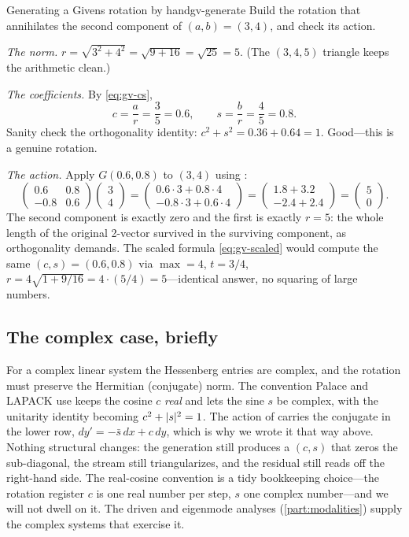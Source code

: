 \begin{workedexample}{Generating a Givens rotation by hand}{gv-generate}
Build the rotation that annihilates the second component of $(a,b) = (3,4)$, and check
its action.

\emph{The norm.} $r = \sqrt{3^2 + 4^2} = \sqrt{9 + 16} = \sqrt{25} = 5$. (The
$(3,4,5)$ triangle keeps the arithmetic clean.)

\emph{The coefficients.} By \cref{eq:gv-cs},
\[
  c = \frac{a}{r} = \frac{3}{5} = 0.6, \qquad
  s = \frac{b}{r} = \frac{4}{5} = 0.8.
\]
Sanity check the orthogonality identity: $c^2 + s^2 = 0.36 + 0.64 = 1$. Good---this is
a genuine rotation.

\emph{The action.} Apply $G(0.6,0.8)$ to $(3,4)$ using :
\[
  \begin{pmatrix} 0.6 & 0.8 \\ -0.8 & 0.6 \end{pmatrix}
  \begin{pmatrix} 3 \\ 4 \end{pmatrix}
  = \begin{pmatrix} 0.6\cdot 3 + 0.8\cdot 4 \\ -0.8\cdot 3 + 0.6\cdot 4 \end{pmatrix}
  = \begin{pmatrix} 1.8 + 3.2 \\ -2.4 + 2.4 \end{pmatrix}
  = \begin{pmatrix} 5 \\ 0 \end{pmatrix}.
\]
The second component is exactly zero and the first is exactly $r = 5$: the whole length
of the original 2-vector survived in the surviving component, as orthogonality
demands. The scaled formula \eqref{eq:gv-scaled} would compute the same $(c,s)=(0.6,0.8)$
via $\max=4$, $t = 3/4$, $r = 4\sqrt{1 + 9/16} = 4\cdot(5/4) = 5$---identical answer,
no squaring of large numbers.
\end{workedexample}

\subsection{The complex case, briefly}
\label{sec:gv-complex}

For a complex linear system the Hessenberg entries are complex, and the rotation must
preserve the Hermitian (conjugate) norm. The convention Palace and LAPACK use keeps the
cosine $c$ \emph{real} and lets the sine $s$ be complex, with the unitarity identity
becoming $c^2 + \lvert s\rvert^2 = 1$. The action of  carries the conjugate
in the lower row, $dy' = -\bar s\,dx + c\,dy$, which is why we wrote it that way above.
Nothing structural changes: the generation still produces a $(c,s)$ that zeros the
sub-diagonal, the stream still triangularizes, and the residual still reads off the
right-hand side. The real-cosine convention is a tidy bookkeeping choice---the rotation
register $c$ is one real number per step, $s$ one complex number---and we will not dwell
on it. The driven and eigenmode analyses (\cref{part:modalities}) supply the complex
systems that exercise it.

